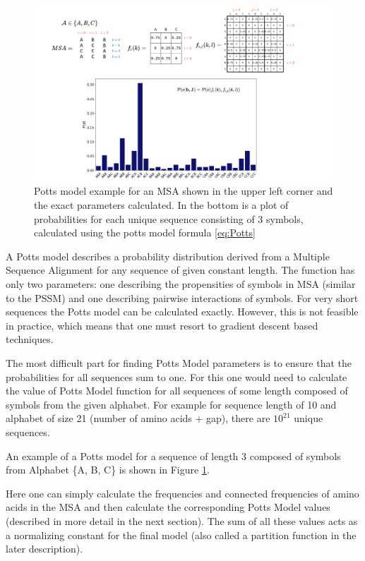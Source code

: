 \begin{figure}
    \centering
    \includegraphics[width=\linewidth]{imgs_tomas/potts_example.png}
    \caption{Potts model example for an MSA shown in the upper left corner and the exact parameters calculated. In the bottom is a plot of probabilities for each unique sequence consisting of 3 symbols, calculated using the potts model formula \ref{eq:Potts}}
    \label{fig:potts_example}
\end{figure}

A Potts model describes a probability distribution derived from a Multiple Sequence Alignment for any sequence of given constant length. The function has only two parameters: one describing the propensities of symbols in MSA (similar to the PSSM) and one describing pairwise interactions of symbols. For very short sequences the Potts model can be calculated exactly. However, this is not feasible in practice, which means that one must resort to gradient descent based techniques. 

The most difficult part for finding Potts Model parameters is to ensure that the probabilities for all sequences sum to one. For this one would need to calculate the value of Potts Model function for all sequences of some length composed of symbols from the given alphabet. For example for sequence length of 10 and alphabet of size 21 (number of amino acids + gap), there are $10^{21}$ unique sequences.

An example of a Potts model for a sequence of length 3 composed of symbols from Alphabet \{A, B, C\} is shown in Figure \ref{fig:potts_example}.

Here one can simply calculate the frequencies and connected frequencies of amino acids in the MSA and then calculate the corresponding Potts Model values (described in more detail in the next section). The sum of all these values acts as a normalizing constant for the final model (also called a partition function in the later description).

